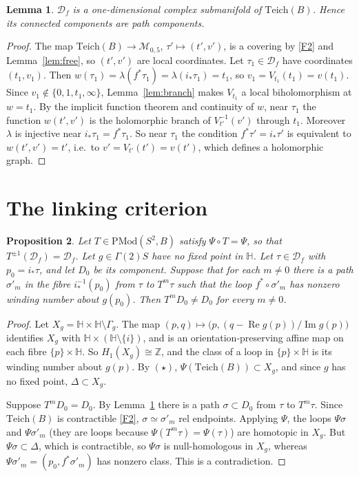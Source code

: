 \documentclass[11pt]{article}
\newtheorem{proposition}{Proposition}[section]
\newtheorem{lemma}[proposition]{Lemma}
\theoremstyle{definition}
\newcommand{\Teich}{\mathrm{Teich}}
\newcommand{\PMod}{\mathrm{PMod}}
\newcommand{\HH}{\mathbb H}
\newcommand{\D}{\mathcal D}
\newcommand{\M}{\mathcal M}
\newcommand{\Img}{\operatorname{Im}}
\newcommand{\Rea}{\operatorname{Re}}
\begin{document}
\begin{lemma}\label{lem:smooth}
$\D_f$ is a one-dimensional complex submanifold of $\Teich(B)$. Hence its connected components are path components.
\end{lemma}


\begin{proof}
The map $\Teich(B)\to\M_{0,5}$, $\tau'\mapsto(t',v')$, is a covering by \ref{F2} and Lemma~\ref{lem:free}, so $(t',v')$ are local coordinates. Let $\tau_1\in\D_f$ have coordinates $(t_1,v_1)$. Then $w(\tau_1)=\lambda(f^*\tau_1)=\lambda(i_*\tau_1)=t_1$, so $v_1=V_{t_1}(t_1)=v(t_1)$. Since $v_1\notin\{0,1,t_1,\infty\}$, Lemma~\ref{lem:branch} makes $V_{t_1}$ a local biholomorphism at $w=t_1$. By the implicit function theorem and continuity of $w$, near $\tau_1$ the function $w(t',v')$ is the holomorphic branch of $V_{t'}^{-1}(v')$ through $t_1$. Moreover $\lambda$ is injective near $i_*\tau_1=f^*\tau_1$. So near $\tau_1$ the condition $f^*\tau'=i_*\tau'$ is equivalent to $w(t',v')=t'$, i.e.\ to $v'=V_{t'}(t')=v(t')$, which defines a holomorphic graph.
\end{proof}

\section{The linking criterion}

\begin{proposition}\label{prop:linking}
Let $T\in\PMod(S^2,B)$ satisfy $\Psi\circ T=\Psi$, so that $T^{\pm1}(\D_f)=\D_f$. Let $g\in\Gamma(2)S$ have no fixed point in $\HH$. Let $\tau\in\D_f$ with $p_0=i_*\tau$, and let $D_0$ be its component. Suppose that for each $m\ne0$ there is a path $\sigma'_m$ in the fibre $i_*^{-1}(p_0)$ from $\tau$ to $T^m\tau$ such that the loop $f^*\circ\sigma'_m$ has nonzero winding number about $g(p_0)$. Then $T^m D_0\ne D_0$ for every $m\ne0$.
\end{proposition}

\begin{proof}
Let $X_g=\HH\times\HH\setminus\Gamma_g$. The map $(p,q)\mapsto\bigl(p,(q-\Rea g(p))/\Img g(p)\bigr)$ identifies $X_g$ with $\HH\times(\HH\setminus\{i\})$, and is an orientation-preserving affine map on each fibre $\{p\}\times\HH$. So $H_1(X_g)\cong\mathbb Z$, and the class of a loop in $\{p\}\times\HH$ is its winding number about $g(p)$. By $(\star)$, $\Psi(\Teich(B))\subset X_g$, and since $g$ has no fixed point, $\Delta\subset X_g$.

Suppose $T^mD_0=D_0$. By Lemma~\ref{lem:smooth} there is a path $\sigma\subset D_0$ from $\tau$ to $T^m\tau$. Since $\Teich(B)$ is contractible \ref{F2}, $\sigma\simeq\sigma'_m$ rel endpoints. Applying $\Psi$, the loops $\Psi\sigma$ and $\Psi\sigma'_m$ (they are loops because $\Psi(T^m\tau)=\Psi(\tau)$) are homotopic in $X_g$. But $\Psi\sigma\subset\Delta$, which is contractible, so $\Psi\sigma$ is null-homologous in $X_g$, whereas $\Psi\sigma'_m=(p_0,f^*\sigma'_m)$ has nonzero class. This is a contradiction.
\end{proof}
\end{document}
